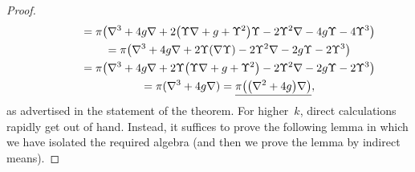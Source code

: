 \documentclass[11pt]{article}
\begin{document}
\begin{proof}
\begin{gather*}
\hphantom{\underline{\pi\big(\hat\nabla^3\phi\big)}}{} = \pi\big(\nabla^3+4g\nabla+2\big(\Upsilon\nabla+g+\Upsilon^2\big)\Upsilon
-2\Upsilon^2\nabla-4g\Upsilon-4\Upsilon^3\big)\\
\hphantom{\underline{\pi\big(\hat\nabla^3\phi\big)}}{} = \pi\big(\nabla^3+4g\nabla+2\Upsilon(\nabla\Upsilon)
-2\Upsilon^2\nabla-2g\Upsilon-2\Upsilon^3\big)\\
\hphantom{\underline{\pi\big(\hat\nabla^3\phi\big)}}{} = \pi\big(\nabla^3+4g\nabla+2\Upsilon\big(\Upsilon\nabla+g+\Upsilon^2\big)
-2\Upsilon^2\nabla-2g\Upsilon-2\Upsilon^3\big)\\
\hphantom{\underline{\pi\big(\hat\nabla^3\phi\big)}}{} = \pi(\nabla^3+4g\nabla) =
\underline{\pi\big(\big(\nabla^2+4g\big)\nabla\big)},
\end{gather*}
as advertised in the statement of the theorem. For higher~$k$, direct
calculations rapidly get out of hand. Instead, it suf\/f\/ices to prove the
following lemma in which we have isolated the required algebra (and then we
prove the lemma by indirect means).
\end{proof}
\end{document}
